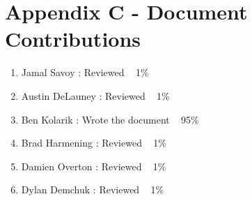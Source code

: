\documentclass{article}
\begin{document}
\section{Appendix C - Document Contributions}

\vspace{2.5mm}

\begin{addmargin}[2em]{0em}
\begin{enumerate}

\item Jamal Savoy : Reviewed ~ 1\%

\item Austin DeLauney : Reviewed ~ 1\%

\item Ben Kolarik : Wrote the document ~ 95\%

\item Brad Harmening : Reviewed ~ 1\%

\item Damien Overton : Reviewed ~ 1\%

\item Dylan Demchuk : Reviewed ~ 1\%

\end{enumerate}
\end{addmargin}
\end{document}
